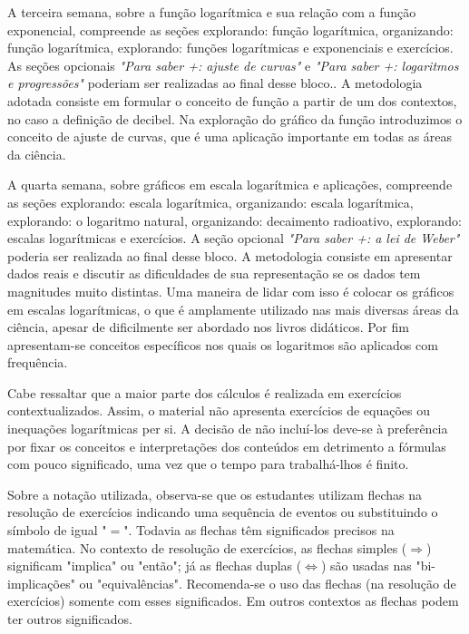 \begin{apresentacao}
A terceira semana, sobre a função logarítmica e sua relação com a função exponencial, compreende as seções explorando: função logarítmica, organizando: função logarítmica, explorando: funções logarítmicas e exponenciais e exercícios. As seções opcionais \textit{"Para saber +: ajuste de curvas"} e \textit{"Para saber +: logaritmos e progressões"} poderiam ser realizadas ao final desse bloco.. A metodologia adotada consiste em formular o conceito de função a partir de um dos contextos, no caso a definição de decibel. Na exploração do gráfico da função introduzimos o conceito de ajuste de curvas, que é uma aplicação importante em todas as áreas da ciência.

A quarta semana, sobre gráficos em escala logarítmica e aplicações, compreende as seções explorando: escala logarítmica, organizando: escala logarítmica, explorando: o logaritmo natural, organizando: decaimento radioativo, explorando: escalas logarítmicas e exercícios. A seção opcional \textit{"Para saber +: a lei de Weber"} poderia ser realizada ao final desse bloco. A metodologia consiste em apresentar dados reais e discutir as dificuldades de sua representação se os dados tem magnitudes muito distintas. Uma maneira de lidar com isso é colocar os gráficos em escalas logarítmicas, o que é amplamente utilizado nas mais diversas áreas da ciência, apesar de dificilmente ser abordado nos livros didáticos. Por fim apresentam-se conceitos específicos nos quais os logaritmos são aplicados com frequência.

Cabe ressaltar que a maior parte dos cálculos é realizada em exercícios contextualizados. Assim, o material não apresenta exercícios de equações ou inequações logarítmicas per si. A decisão de não incluí-los deve-se à preferência por fixar os conceitos e interpretações dos conteúdos em detrimento a fórmulas com pouco significado, uma vez que o tempo para trabalhá-lhos é finito.

Sobre a notação utilizada, observa-se que os estudantes utilizam flechas na resolução de exercícios indicando uma sequência de eventos ou substituindo o símbolo de igual "$=$". Todavia as flechas têm significados precisos na matemática. No contexto de resolução de exercícios, as flechas simples ($\Longrightarrow$) significam "implica" ou "então"; já as flechas duplas ($\Longleftrightarrow$) são usadas nas "bi-implicações" ou "equivalências". Recomenda-se o uso das flechas (na resolução de exercícios) somente com esses significados. Em outros contextos as flechas podem ter outros significados.


\end{apresentacao}
